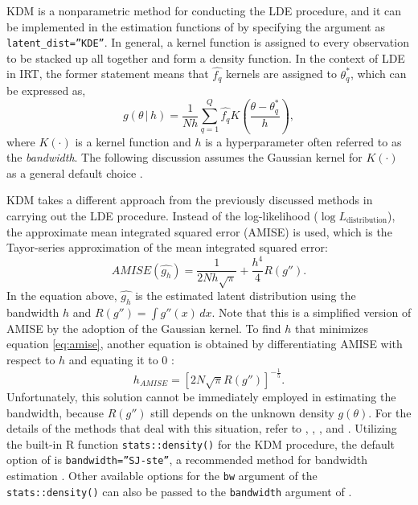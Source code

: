 KDM is a nonparametric method for conducting the LDE procedure, and it can be
implemented in the estimation functions of  by
specifying the argument as \texttt{latent\_dist=”KDE”}. In general, a kernel
function is assigned to every observation to be stacked up all together
and form a density function. In the context of LDE in IRT, the former statement
means that \(\hat{f_{q}}\) kernels are assigned to \(\theta_{q}^{*}\), which
can be expressed as,
\begin{equation}
g{\left( \theta \, | \, h \right)} =
\frac{1}{Nh} \sum_{q = 1}^{Q}{\hat{f_q} K{\left( \frac{\theta - \theta_{q}^{*}}{h} \right)}} ,
\label{eq:kdm}
\end{equation}
where \(K{( \cdot )}\) is a kernel function and \(h\) is a hyperparameter
often referred to as the \emph{bandwidth}. The following discussion assumes
the Gaussian kernel for \(K{( \cdot )}\) as a general default choice \citep{Gramacki:2018, Silverman:1986}.

KDM takes a different approach from the previously discussed methods
in carrying out the LDE procedure. Instead of the log-likelihood (\(\log{L_{\text{distribution}}}\)),
the approximate mean integrated squared error (AMISE) is used,
which is the Tayor-series approximation of the mean integrated squared error:
\begin{equation}
AMISE{\left( \hat{g_h} \right)} =
\frac{1}{2 N h \sqrt{\pi}} +
\frac{h^{4}}{4} R{\left( g'' \right)}.
\label{eq:amise}
\end{equation}
In the equation above, \(\hat{g_h}\) is the estimated latent
distribution using the bandwidth \(h\) and
\(R{\left( g'' \right)} = \int{g''{( x )} \, dx}\). Note that this is
a simplified version of AMISE by the adoption of the Gaussian kernel.
To find \(h\) that minimizes equation \eqref{eq:amise},
another equation is obtained by differentiating AMISE with
respect to \(h\) and equating it to 0 \citep{Gramacki:2018, Silverman:1986, Wand+Jones:1995}:
\begin{equation}
h_{AMISE} =
\left[
2 N \sqrt{\pi} R{\left( g'' \right)}
\right]^{- \frac{1}{5}} .
\label{eq:amiseh}
\end{equation}
Unfortunately, this solution cannot be immediately employed in
estimating the bandwidth, because \(R{\left( g'' \right)}\) still depends
on the unknown density \(g{(\theta)}\). For the details of the methods that
deal with this situation, refer to \citet{Silverman:1986}, \citet{Gramacki:2018},
\citet{Sheather:2004}, and \citet{Wand+Jones:1995}. Utilizing the built-in R function
\texttt{stats::density()} for the KDM procedure, the default option of
 is \texttt{bandwidth=”SJ-ste”}, a recommended method for bandwidth
estimation \citep{Jones+Marron+Sheather:1996, Sheather+Jones:1991}. Other
available options for the \texttt{bw} argument of the \texttt{stats::density()} can
also be passed to the \texttt{bandwidth} argument of .

